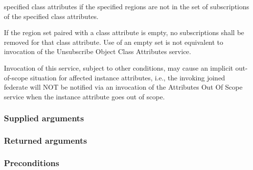 \begin{compactstdpage}

    specified class attributes if the specified regions are not in the set of subscriptions of the specified class attributes.

    If the region set paired with a class attribute is empty, no subscriptions shall be removed for that class attribute. Use of an empty set is not equivalent to invocation of the Unsubscribe Object Class Attributes service.

    Invocation of this service, subject to other conditions, may cause an implicit out-of-scope situation for affected instance attributes, i.e., the invoking joined federate will NOT be notified via an invocation of the Attributes Out Of Scope \rtiinitiated{} service when the instance attribute goes out of scope.

    \subsubsection{Supplied arguments}


    \subsubsection{Returned arguments}


    \subsubsection{Preconditions}



\end{compactstdpage}
